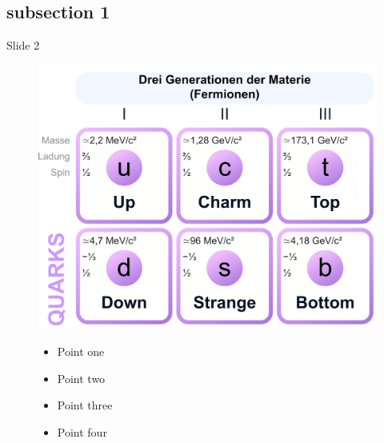 \documentclass[handout]{beamer} %
\begin{document}
    \subsection{subsection 1}
    \begin{frame}{Slide 2}
      \begin{figure}
        \centering
        \begin{minipage}{0.5\textwidth}
          \centering
          \includegraphics[width=\linewidth, keepaspectratio, height=\textheight]{Standard_Model_of_Elementary_Particles_zoom2.png}\tiny
          \\ \end{minipage}
        \hfill
        \begin{minipage}{0.48\textwidth}
          \begin{itemize}\pause
            \item Point one\pause
            \item Point two\pause
            \item Point three\pause
            \item Point four
          \end{itemize}
          \end{minipage}
      \end{figure}
    \end{frame}
    
\end{document}
